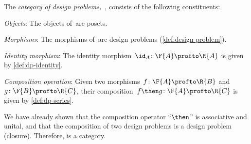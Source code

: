 \begin{definition}[Category \DP]
  \label{define:DP}
  The \emph{category of design problems,~\DP}, consists of the following constituents:
%
  \begin{compactenum}
    \item \emph{Objects}: The objects of~\DP are posets.
    \item \emph{Morphisms}: The morphisms of~\DP are design problems (\cref{def:design-problem}).
    \item \emph{Identity morphism}: The identity morphism~$\id_A \colon \F{A} \profto \R{A}$ is given by \cref{def:dp-identity}.
    \item \emph{Composition operation}: Given two morphisms~$f \colon  \F{A} \profto \R{B}$ and~$g \colon \F{B} \profto \R{C}$, their
    composition~$f\then g\colon  \F{A} \profto \R{C}$ is
    given by \cref{def:dp-series}.
  \end{compactenum}
\end{definition}

We have already shown that the composition operator ``$\then$'' is associative and unital, and that the composition of two design problems is a design problem (closure). Therefore, \DP is a category.


